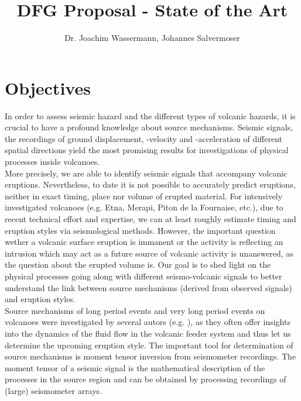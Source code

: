 \documentclass[12pt, a4paper]{article}
\title{DFG Proposal - State of the Art}
\author{Dr. Joachim Wassermann, Johannes Salvermoser}
\date{}
\begin{document}
\maketitle



\section*{Objectives}

In order to assess seismic hazard and the different types of volcanic hazards, it is crucial to have a profound knowledge about source mechanisms. Seismic signals, the recordings of ground displacement, -velocity and -acceleration of different spatial directions yield the most promising results for investigations of physical processes inside volcanoes.\\
More precisely, we are able to identify seismic signals that accompany volcanic eruptions. Nevertheless, to date it is not possible to accurately predict eruptions, neither in exact timing, place nor volume of erupted material. For intensively investigated volcanoes (e.g. Etna, Merapi, Piton de la Fournaise, etc.), due to recent technical effort and expertise, we can at least roughly estimate timing and eruption styles via seismological methods. However, the important question wether a volcanic surface eruption is immanent or the activity is reflecting an intrusion which may act as a future source of volcanic activity is unanswered, as the question about the erupted volume is. Our goal is to shed light on the physical processes going along with different seismo-volcanic signals to better understand the link between source mechanisms (derived from observed signals) and eruption styles.\\

Source mechanisms of long period events and very long period events on volcanoes were investigated by several autors (e.g. \citep{Ohminato1998,Chouet2003,Cesca2008,Cannata2009, DeBarros2011}), as they often offer insights into the dynamics of the fluid flow in the volcanic feeder system and thus let us determine the upcoming eruption style. The important tool for determination of source mechanisms is moment tensor inversion from seismometer recordings. The moment tensor of a seismic signal is the mathematical description of the processes in the source region and can be obtained by processing recordings of (large) seismometer arrays.\\
\end{document}
